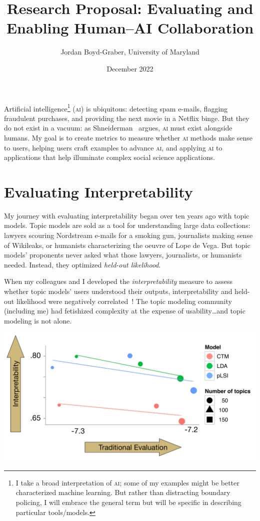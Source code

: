\documentclass[11pt]{amsart}
\newcommand{\abr}[1]{\textsc{#1}}
\begin{document}
 \title{Research Proposal: Evaluating and Enabling Human--AI Collaboration}

 \author{Jordan Boyd-Graber, University of Maryland}


\date{December 2022}

\maketitle

Artificial intelligence\footnote{I take a broad interpretation of
\abr{ai}; some of my examples might be better characterized machine
learning.  But rather than distracting boundary policing, I will embrace
the general term but will be specific in describing particular tools/models.}
(\abr{ai}) is ubiquitous: detecting spam e-mails, flagging fraudulent
purchases, and providing the next movie in a Netflix binge.
%
But they do not exist in a vacuum: as
Shneiderman~\cite{shneiderman-21} argues, \abr{ai} must exist
alongside humans.
%
My goal is to create metrics to measure whether \abr{ai} methods make
sense to users, helping users craft examples to advance \abr{ai}, and
applying \abr{ai} to applications that help illuminate complex social
science applications.

\section{Evaluating Interpretability}

My journey with evaluating interpretability began over ten years ago
with topic models.
%
Topic models are sold as a tool for understanding large data
collections: lawyers scouring Nordstream e-mails for a smoking gun,
journalists making sense of Wikileaks, or humanists characterizing the
oeuvre of Lope de Vega.
%
But topic models' proponents never asked what those lawyers,
journalists, or humanists needed.
%
Instead, they optimized \emph{held-out likelihood}.

When my colleagues
and I developed the \emph{interpretability} measure to assess whether topic
models' users understood their outputs, interpretability and
held-out likelihood were negatively correlated~\cite{chang-09b}!
%
The topic modeling community (including me) had fetishized complexity
at the expense of usability\dots and topic modeling is not alone.

\begin{center}
\includegraphics[width=.5\linewidth]{images/prec_ll_4}
\end{center}
\end{document}
